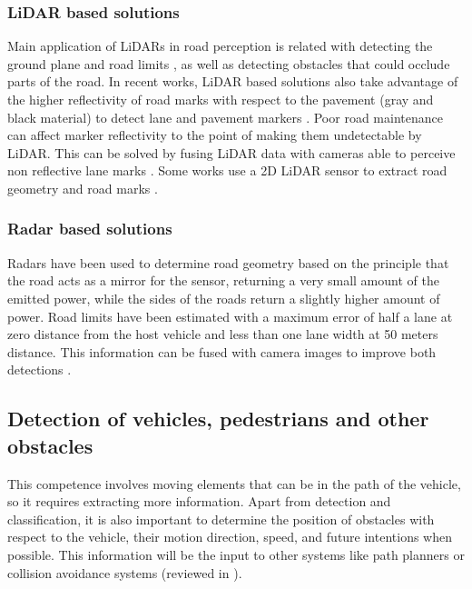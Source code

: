 \documentclass[journal]{IEEEtran}
\begin{document}
\subsubsection{LiDAR based solutions}
Main application of LiDARs in road perception is related with detecting the 
ground plane and road limits \cite{pengpeng20193d}, as well as detecting obstacles that could occlude 
parts of the road.
In recent works, LiDAR based solutions also take advantage of the higher 
reflectivity of road marks with respect to the pavement (gray and black 
material) to detect lane \cite{yang2012automated, li2013new} and
pavement markers \cite{Zhang2016}.
Poor road maintenance can affect marker reflectivity to the point of making 
them undetectable by LiDAR. This can be solved by fusing LiDAR 
data with cameras able to perceive non reflective lane marks \cite{lee2017avm}.
Some works use a 2D LiDAR sensor to extract road geometry and road marks 
\cite{nie2012camera, kim2015lane}.


\subsubsection{Radar based solutions}
Radars have been used to determine road geometry based on the principle that the
road acts as a mirror for the sensor, returning a very small amount of the 
emitted power, while the sides of the roads return a slightly higher 
amount of power. Road limits have been estimated with a
maximum error of half a lane at zero distance from the host vehicle and less 
than one lane width at 50 meters distance. This information can be fused with
camera images to improve both detections 
\cite{kaliyaperumal2001algorithm, ma2000simultaneous, Janda2013}.

\subsection{Detection of vehicles, pedestrians and other obstacles}
This competence involves moving elements that can be in the path of the 
vehicle, so it requires extracting more information. Apart from detection and 
classification, it is also important to determine the position of obstacles 
with respect to the vehicle, their motion direction, speed, and 
future intentions when possible. 
This information will be the input to other systems like path planners 
or collision avoidance systems (reviewed in \cite{mukhtar2015vehicle}).
\end{document}
